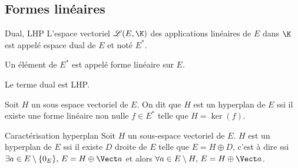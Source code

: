 \subsection{Formes linéaires}

\begin{definition}{Dual, LHP}{}
    L'espace vectoriel $\mathscr L(E, \K)$ des applications linéaires de $E$ dans $\K$ est appelé 
    espace dual de $E$ et noté $E^*$.

    Un élément de $E^*$ est appelé forme linéaire sur $E$.
\end{definition}

\begin{remarque}
    Le terme dual est LHP. 
\end{remarque}

\begin{definition}{}{}
    Soit $H$ un sous espace vectoriel de $E$. On dit que $H$ est un hyperplan de $E$ ssi
    il existe une forme linéaire non nulle $f \in E^*$ telle que $H = \ker(f)$.
\end{definition}

\begin{proposition}{Caractérisation hyperplan}{}
    Soit $H$ un sous-espace vectoriel de $E$. $H$ est un hyperplan de $E$ ssi il existe $D$ droite de $E$ telle que 
    $E = H \oplus D$, c'est à dire ssi $\exists a \in E \setminus \{0_E\}, \, E = H \oplus \Vect a$ 
    et alors $\forall a \in E \setminus H, \, E = H \oplus \Vect a$.
\end{proposition}


